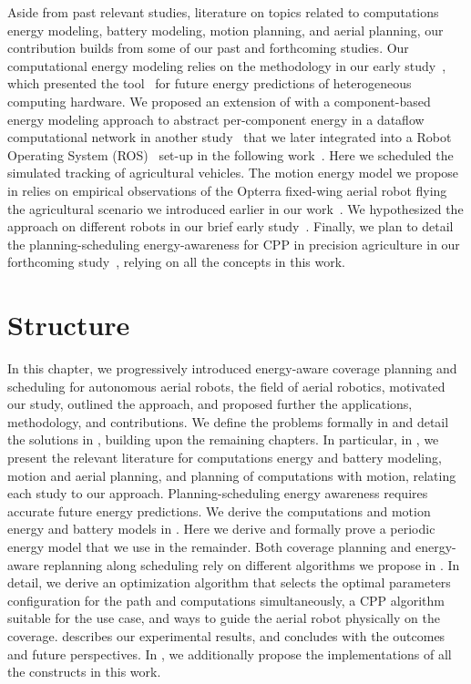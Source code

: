 Aside from past relevant studies, literature on topics related to computations energy modeling, battery modeling, motion planning, and aerial planning, our contribution builds from some of our past and forthcoming studies. Our computational energy modeling relies on the methodology in our early study~\citep{seewald2019coarse}, which presented the \powprof{} tool~\citep{powprofiler} for future energy predictions of heterogeneous computing hardware. We proposed an extension of \powprof{} with a component-based energy modeling approach to abstract per-component energy in a dataflow computational network in another study~\citep{seewald2019component} that we later integrated into a Robot Operating System (ROS)~\citep{quigley2009ros} set-up in the following work~\citep{zamanakos2020energy}. Here we scheduled the simulated tracking of agricultural vehicles. The motion energy model we propose in  relies on empirical observations of the Opterra fixed-wing aerial robot flying the agricultural scenario we introduced earlier in our work~\citep{seewald2020mechanical}. We hypothesized the approach on different robots in our brief early study~\citep{seewald2020beyond}. Finally, we plan to detail the planning-scheduling energy-awareness for CPP in precision agriculture in our forthcoming study~\citep{seewald202Xenergy}, relying on all the concepts in this work. 

\section{Structure}
\label{sec:structure}

In this chapter, we progressively introduced energy-aware coverage planning and scheduling for autonomous aerial robots, the field of aerial robotics, motivated our study, outlined the approach, and proposed further the applications, methodology, and contributions. We define the problems formally in  and detail the solutions in , building upon the remaining chapters. In particular, in , we present the relevant literature for computations energy and battery modeling, motion and aerial planning, and planning of computations with motion, relating each study to our approach. Planning-scheduling energy awareness requires accurate future energy predictions. We derive the computations and motion energy and battery models in . Here we derive and formally prove a periodic energy model that we use in the remainder. Both coverage planning and energy-aware replanning along scheduling rely on different algorithms we propose in . In detail, we derive an optimization algorithm that selects the optimal parameters configuration for the path and computations simultaneously, a CPP algorithm suitable for the use case, and ways to guide the aerial robot physically on the coverage.  describes our experimental results, and  concludes with the outcomes and future perspectives. In , we additionally propose the implementations of all the constructs in this work.


